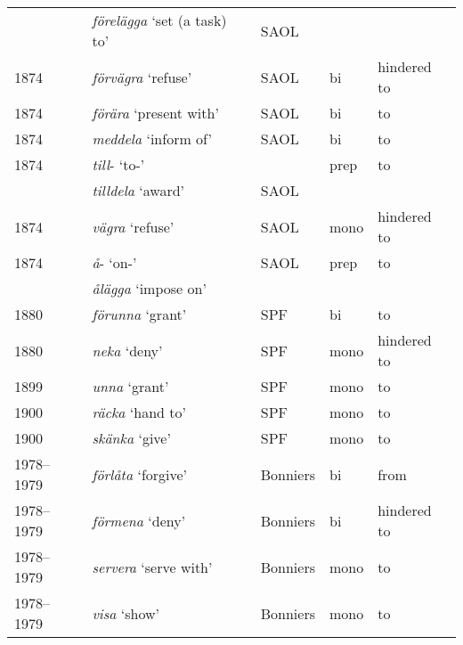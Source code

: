 \documentclass[output=paper]{langscibook}
\begin{document}
\begin{longtable}{ll lll}
     & \textit{förelägga} ‘set (a task) to’  &     SAOL &\\
1874 & \textit{förvägra} ‘refuse’            &     SAOL & bi   & hindered to\\
1874 & \textit{förära} ‘present with’        &     SAOL & bi   & to\\
1874 & \textit{meddela} ‘inform of’          &     SAOL & bi   & to\\
1874 & \textit{till}{}- ‘to-’                &          & prep & to\\
     & \textit{tilldela} ‘award’             &     SAOL &\\
1874 & \textit{vägra} ‘refuse’               &     SAOL & mono  & hindered to\\
1874 & \textit{å}{}- ‘on-’                   &     SAOL & prep &  to\\
     & \textit{ålägga} ‘impose on’           &          &\\
1880 & \textit{förunna} ‘grant’              &      SPF & bi   & to\\
1880 & \textit{neka} ‘deny’                  &      SPF & mono & hindered to\\
1899 & \textit{unna} ‘grant’                 &      SPF & mono & to\\
1900 & \textit{räcka} ‘hand to’              &      SPF & mono & to\\
1900 & \textit{skänka} ‘give’                &      SPF & mono & to\\
1978--1979 & \textit{förlåta} ‘forgive’      & Bonniers & bi  & from\\
1978--1979 & \textit{förmena} ‘deny’         & Bonniers & bi  & hindered to\\
1978--1979 & \textit{servera} ‘serve with’   & Bonniers & mono & to\\
1978--1979 & \textit{visa} ‘show’            & Bonniers & mono & to\\
\end{longtable}
\end{document}
